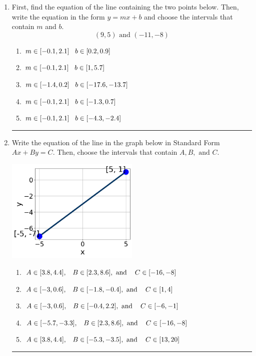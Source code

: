 \documentclass[14pt]{extbook}
\newcommand{\litem}[1]{\item#1\hspace*{-1cm}\rule{\textwidth}{0.4pt}}
\begin{document}
\begin{enumerate}
{\begin{enumerate}[label=\Alph*.]
\end{enumerate} }
\litem{
First, find the equation of the line containing the two points below. Then, write the equation in the form $ y=mx+b $ and choose the intervals that contain $m$ and $b$.\[ (9, 5) \text{ and } (-11, -8) \]\begin{enumerate}[label=\Alph*.]
\item \( m \in [-0.1, 2.1] \hspace*{3mm} b \in [0.2, 0.9] \)
\item \( m \in [-0.1, 2.1] \hspace*{3mm} b \in [1, 5.7] \)
\item \( m \in [-1.4, 0.2] \hspace*{3mm} b \in [-17.6, -13.7] \)
\item \( m \in [-0.1, 2.1] \hspace*{3mm} b \in [-1.3, 0.7] \)
\item \( m \in [-0.1, 2.1] \hspace*{3mm} b \in [-4.3, -2.4] \)

\end{enumerate} }
\litem{
Write the equation of the line in the graph below in Standard Form $Ax+By=C$. Then, choose the intervals that contain $A, B, \text{ and } C$.
\begin{center}
    \includegraphics[width=0.5\textwidth]{../Figures/linearGraphToStandardC.png}
\end{center}
\begin{enumerate}[label=\Alph*.]
\item \( A \in [3.8, 4.4], \hspace{3mm} B \in [2.3, 8.6], \text{ and } \hspace{3mm} C \in [-16, -8] \)
\item \( A \in [-3, 0.6], \hspace{3mm} B \in [-1.8, -0.4], \text{ and } \hspace{3mm} C \in [1, 4] \)
\item \( A \in [-3, 0.6], \hspace{3mm} B \in [-0.4, 2.2], \text{ and } \hspace{3mm} C \in [-6, -1] \)
\item \( A \in [-5.7, -3.3], \hspace{3mm} B \in [2.3, 8.6], \text{ and } \hspace{3mm} C \in [-16, -8] \)
\item \( A \in [3.8, 4.4], \hspace{3mm} B \in [-5.3, -3.5], \text{ and } \hspace{3mm} C \in [13, 20] \)


\end{enumerate}}
\end{enumerate}
\end{document}
